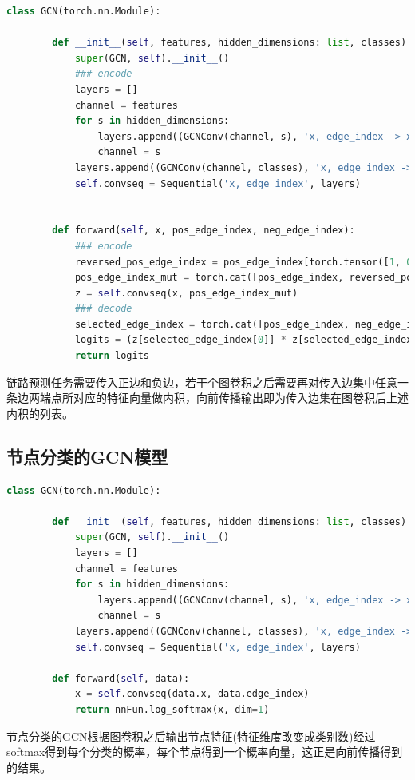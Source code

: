 \documentclass{article}
\begin{document}
	\begin{lstlisting}[language=Python, caption=链路预测的GCN模型代码]
	class GCN(torch.nn.Module):
	
		def __init__(self, features, hidden_dimensions: list, classes):
			super(GCN, self).__init__()
			### encode
			layers = []
			channel = features
			for s in hidden_dimensions:
				layers.append((GCNConv(channel, s), 'x, edge_index -> x'))
				channel = s
			layers.append((GCNConv(channel, classes), 'x, edge_index -> x'))
			self.convseq = Sequential('x, edge_index', layers)
		
		
		def forward(self, x, pos_edge_index, neg_edge_index):
			### encode
			reversed_pos_edge_index = pos_edge_index[torch.tensor([1, 0]), :]
			pos_edge_index_mut = torch.cat([pos_edge_index, reversed_pos_edge_index], dim=-1)
			z = self.convseq(x, pos_edge_index_mut)
			### decode
			selected_edge_index = torch.cat([pos_edge_index, neg_edge_index], dim=-1)
			logits = (z[selected_edge_index[0]] * z[selected_edge_index[1]]).sum(dim=-1)
			return logits   
	\end{lstlisting}
	链路预测任务需要传入正边和负边，若干个图卷积之后需要再对传入边集中任意一条边两端点所对应的特征向量做内积，向前传播输出即为传入边集在图卷积后上述内积的列表。

\subsection{节点分类的GCN模型}

\begin{lstlisting}[language=Python, caption=链路预测的GCN模型代码]
	class GCN(torch.nn.Module):
	
		def __init__(self, features, hidden_dimensions: list, classes):
			super(GCN, self).__init__()
			layers = []
			channel = features
			for s in hidden_dimensions:
				layers.append((GCNConv(channel, s), 'x, edge_index -> x'))
				channel = s
			layers.append((GCNConv(channel, classes), 'x, edge_index -> x'))
			self.convseq = Sequential('x, edge_index', layers)
		
		def forward(self, data):
			x = self.convseq(data.x, data.edge_index)
			return nnFun.log_softmax(x, dim=1)
\end{lstlisting}
节点分类的GCN根据图卷积之后输出节点特征(特征维度改变成类别数)经过softmax得到每个分类的概率，每个节点得到一个概率向量，这正是向前传播得到的结果。


	\setcounter{section}{4}
\end{document}
